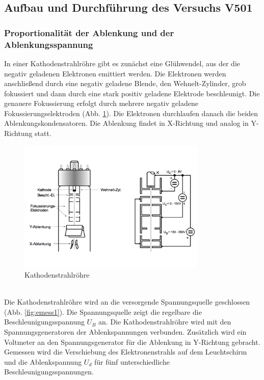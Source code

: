 \subsection{Aufbau und Durchführung des Versuchs V501}
\subsubsection{Proportionalität der Ablenkung und der Ablenkungsspannung}
In einer Kathodenstrahlröhre gibt es zunächst eine Glühwendel, aus der die negativ geladenen Elektronen emittiert werden.
Die Elektronen werden anschließend durch eine negativ geladene Blende, den Wehnelt-Zylinder, grob fokussiert und dann durch eine stark positiv geladene Elektrode beschleunigt.
Die genauere Fokussierung erfolgt durch mehrere negativ geladene Fokussierungselektroden (Abb. \ref{fig:KSR}).
Die Elektronen durchlaufen danach die beiden Ablenkungskondensatoren.
Die Ablenkung findet in X-Richtung und analog in Y-Richtung statt.
\begin{figure}[h!]
  \centering
  \includegraphics[width=0.8\textwidth]{EFeld1.pdf}
  \caption{Kathodenstrahlröhre \cite{1}}
  \label{fig:KSR}
\end{figure}
\\Die Kathodenstrahlröhre wird an die versorgende Spannungsquelle geschlossen (Abb. \ref{fig:emess1}).
Die Spannungsquelle zeigt die regelbare die Beschleunigungsspannung $U_{B}$ an.
Die Kathodenstrahlröhre wird mit den Spannungsgeneratoren der Ablenkspannungen verbunden.
Zusätzlich wird ein Voltmeter an den Spannungsgenerator für die Ablenkung in Y-Richtung gebracht.
Gemessen wird die Verschiebung des Elektronenstrahls auf dem Leuchtschirm und die Ablenkspannung $U_{d}$ für fünf unterschiedliche Beschleunigungsspannungen.
